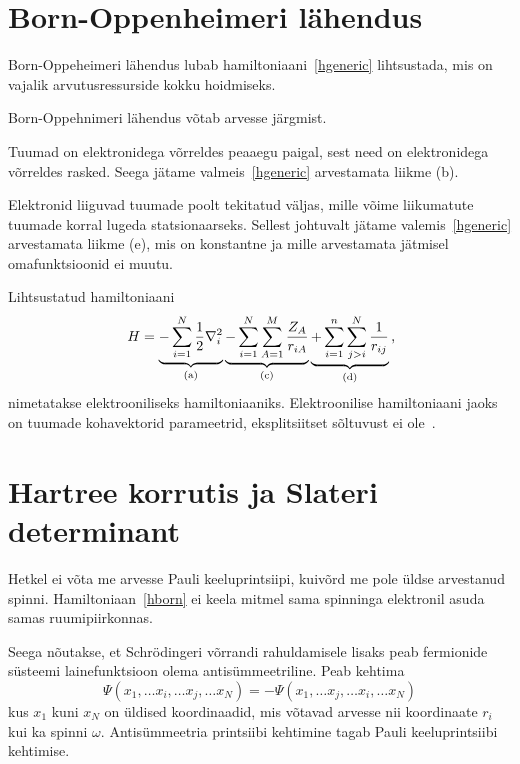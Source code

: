 \documentclass[12pt]{report}
\begin{document}
\section{Born-Oppenheimeri lähendus}\label{born-oppeheimer}

Born-Oppeheimeri lähendus lubab hamiltoniaani~\eqref{hgeneric} lihtsustada, mis on vajalik arvutusressurside kokku hoidmiseks.

Born-Oppehnimeri lähendus võtab arvesse järgmist.

Tuumad on elektronidega võrreldes peaaegu paigal, sest need on elektronidega võrreldes rasked.
Seega jätame valmeis~\eqref{hgeneric} arvestamata liikme (b).

Elektronid liiguvad tuumade poolt tekitatud väljas, mille võime liikumatute tuumade korral lugeda statsionaarseks.
Sellest johtuvalt jätame valemis~\eqref{hgeneric} arvestamata liikme (e), mis on konstantne ja mille arvestamata jätmisel omafunktsioonid ei muutu.

Lihtsustatud hamiltoniaani
\begin{equation}\label{hborn}
    H = \underbrace{-\sum_{i=1}^N\frac{1}{2}\nabla_i^2}_\mathrm{(a)}
        \underbrace{-\sum_{i=1}^N\sum_{A=1}^M\frac{Z_A}{r_{iA}}}_\mathrm{(c)}
        \underbrace{+\sum_{i=1}^n\sum_{j>i}^N\frac{1}{r_{ij}}}_\mathrm{(d)}\rlap{,}
\end{equation}
nimetatakse elektrooniliseks hamiltoniaaniks.
Elektroonilise hamiltoniaani jaoks on tuumade kohavektorid parameetrid, eksplitsiitset sõltuvust ei ole~\cite{szabo+ostlnud}.


\section{Hartree korrutis ja Slateri determinant}\label{hartree+slater}

Hetkel ei võta me arvesse Pauli keeluprintsiipi, kuivõrd me pole üldse arvestanud spinni.
Hamiltoniaan~\eqref{hborn} ei keela mitmel sama spinninga elektronil asuda samas ruumipiirkonnas.

Seega nõutakse, et Schrödingeri võrrandi rahuldamisele lisaks peab fermionide süsteemi lainefunktsioon olema antisümmeetriline.
Peab kehtima
\begin{equation}
    \Psi(x_1,\ldots x_i,\ldots x_j,\ldots x_N)=-\Psi(x_1,\ldots x_j,\ldots x_i,\ldots x_N)
\end{equation}
kus \(x_1\) kuni \(x_N\) on üldised koordinaadid, mis võtavad arvesse nii koordinaate \(r_i\) kui ka spinni \(\omega\).
Antisümmeetria printsiibi kehtimine tagab Pauli keeluprintsiibi kehtimise.
\end{document}
